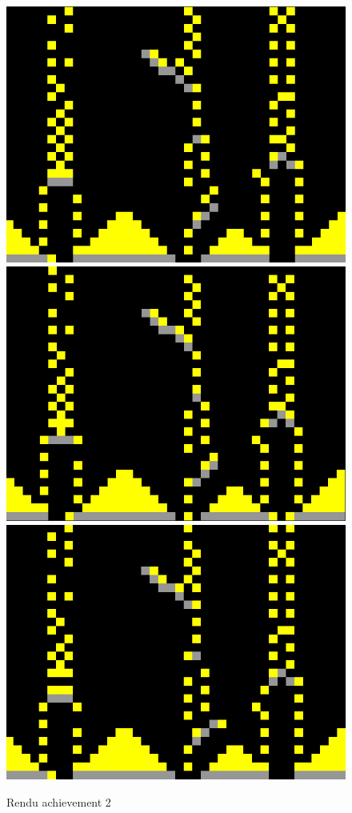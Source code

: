 \documentclass[a4paper]{article}
\begin{document}
\begin{figure}[htp]

\includegraphics[width=.3\textwidth]{img/sable1.png}\hfill
\includegraphics[width=.3\textwidth]{img/sable2.png}\hfill
\includegraphics[width=.3\textwidth]{img/sable3.png}

\caption{Rendu achievement 2}
\label{fig:sable_disp}

\end{figure}

\newpage
\end{document}
